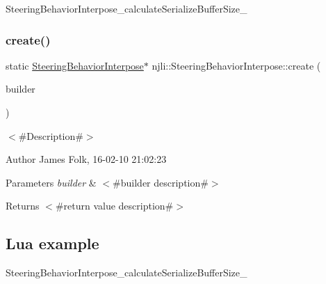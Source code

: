 \begin{DoxyCodeInclude}
\end{DoxyCodeInclude}
Steering\+Behavior\+Interpose\+\_\+calculate\+Serialize\+Buffer\+Size\+\_\+ \mbox{\label{classnjli_1_1_steering_behavior_interpose_a8f3890db691eeadac43a976f51e25a68}} 
\subsubsection{\texorpdfstring{create()}{create()}\hspace{0.1cm}{\footnotesize\ttfamily [2/2]}}
{\footnotesize\ttfamily static \mbox{\hyperlink{classnjli_1_1_steering_behavior_interpose}{Steering\+Behavior\+Interpose}}$\ast$ njli\+::\+Steering\+Behavior\+Interpose\+::create (\begin{DoxyParamCaption}\item[{const \mbox{\hyperlink{classnjli_1_1_steering_behavior_interpose_builder}{Steering\+Behavior\+Interpose\+Builder}} \&}]{builder }\end{DoxyParamCaption})\hspace{0.3cm}{\ttfamily [static]}}



$<$\#\+Description\#$>$ 

\begin{DoxyAuthor}{Author}
James Folk, 16-\/02-\/10 21\+:02\+:23
\end{DoxyAuthor}

\begin{DoxyParams}{Parameters}
{\em builder} & $<$\#builder description\#$>$\\
\hline
\end{DoxyParams}
\begin{DoxyReturn}{Returns}
$<$\#return value description\#$>$
\end{DoxyReturn}
\hypertarget{classnjli_1_1_steering_behavior_wander_ex1}{}\subsection{Lua example}\label{classnjli_1_1_steering_behavior_wander_ex1}

\begin{DoxyCodeInclude}
\end{DoxyCodeInclude}
Steering\+Behavior\+Interpose\+\_\+calculate\+Serialize\+Buffer\+Size\+\_\+ \mbox{\label{classnjli_1_1_steering_behavior_interpose_a7b1ea421777fb90c031b30122788bcbd}} 

